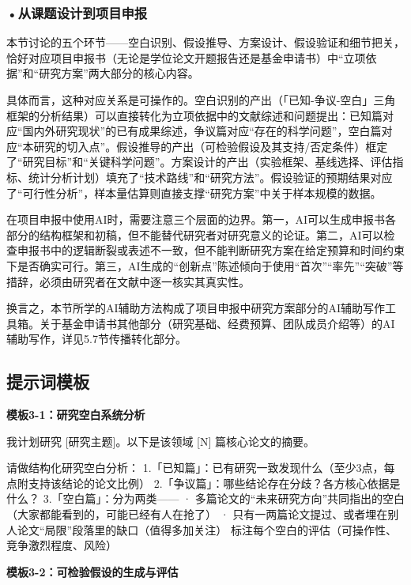 \smallskip
\subsubsection*{\textbf{•从课题设计到项目申报}}本节讨论的五个环节——空白识别、假设推导、方案设计、假设验证和细节把关，恰好对应项目申报书（无论是学位论文开题报告还是基金申请书）中``立项依据''和``研究方案''两大部分的核心内容。

具体而言，这种对应关系是可操作的。空白识别的产出（「已知-争议-空白」三角框架的分析结果）可以直接转化为立项依据中的文献综述和问题提出：已知篇对应``国内外研究现状''的已有成果综述，争议篇对应``存在的科学问题''，空白篇对应``本研究的切入点''。假设推导的产出（可检验假设及其支持/否定条件）框定了``研究目标''和``关键科学问题''。方案设计的产出（实验框架、基线选择、评估指标、统计分析计划）填充了``技术路线''和``研究方法''。假设验证的预期结果对应了``可行性分析''，样本量估算则直接支撑``研究方案''中关于样本规模的数据。

在项目申报中使用AI时，需要注意三个层面的边界。第一，AI可以生成申报书各部分的结构框架和初稿，但不能替代研究者对研究意义的论证。第二，AI可以检查申报书中的逻辑断裂或表述不一致，但不能判断研究方案在给定预算和时间约束下是否确实可行。第三，AI生成的``创新点''陈述倾向于使用``首次''``率先''``突破''等措辞，必须由研究者在文献中逐一核实其真实性。

换言之，本节所学的AI辅助方法构成了项目申报中研究方案部分的AI辅助写作工具箱。关于基金申请书其他部分（研究基础、经费预算、团队成员介绍等）的AI辅助写作，详见5.7节传播转化部分。


\subsection*{提示词模板}

\textbf{模板3-1：研究空白系统分析}

\begin{tcolorbox}[promptbox]
我计划研究 [研究主题]。以下是该领域 [N] 篇核心论文的摘要。

请做结构化研究空白分析：
1.「已知篇」：已有研究一致发现什么（至少3点，每点附支持该结论的论文比例）
2.「争议篇」：哪些结论存在分歧？各方核心依据是什么？
3.「空白篇」：分为两类——
   · 多篇论文的``未来研究方向''共同指出的空白（大家都能看到的，可能已经有人在抢了）
   · 只有一两篇论文提过、或者埋在别人论文``局限''段落里的缺口（值得多加关注）
   标注每个空白的评估（可操作性、竞争激烈程度、风险）
\end{tcolorbox}

\textbf{模板3-2：可检验假设的生成与评估}

